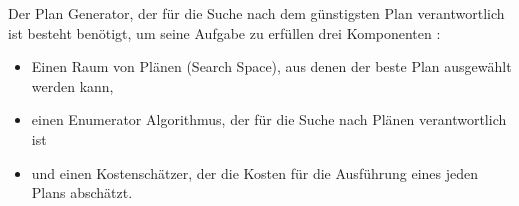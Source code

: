 Der Plan Generator, der für die Suche nach dem günstigsten Plan verantwortlich ist besteht benötigt, um seine Aufgabe zu erfüllen drei Komponenten \cite{chaudhuri1998overview}: 

\begin{itemize}
\item Einen Raum von Plänen (Search Space), aus denen der beste Plan ausgewählt werden kann,
\item einen Enumerator Algorithmus, der für die Suche nach Plänen verantwortlich ist
\item und einen Kostenschätzer, der die Kosten für die Ausführung eines jeden Plans abschätzt.
\end{itemize}

